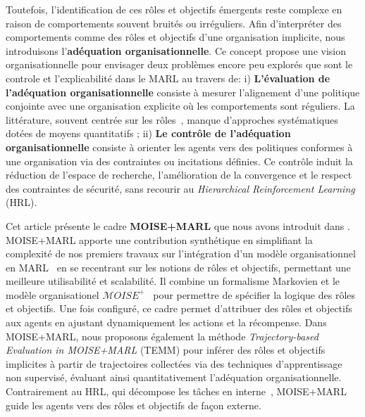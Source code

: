 \documentclass[final]{jfsma}
\begin{document}
Toutefois, l’identification de ces rôles et objectifs émergents reste complexe en raison de comportements souvent bruités ou irréguliers. Afin d’interpréter des comportements comme des rôles et objectifs d'une organisation implicite, nous introduisons l’\textbf{adéquation organisationnelle}.
Ce concept propose une vision organisationnelle pour envisager deux problèmes encore peu explorés que sont le controle et l'explicabilité dans le MARL au travers de:
i) \textbf{L'évaluation de l'adéquation organisationnelle} consiste à mesurer l'alignement d'une politique conjointe avec une organisation explicite où les comportements sont réguliers. La littérature, souvent centrée sur les rôles~\cite{Isakov2024, Wen2024, Xie2024}, manque d'approches systématiques dotées de moyens quantitatifs
; \quad
ii) \textbf{Le contrôle de l'adéquation organisationnelle} consiste à orienter les agents vers des politiques conformes à une organisation via des contraintes ou incitations définies. Ce contrôle induit la réduction de l'espace de recherche, l'amélioration de la convergence et le respect des contraintes de sécurité, sans recourir au \textit{Hierarchical Reinforcement Learning} (HRL).

\noindent Cet article présente le cadre \textbf{MOISE+MARL} que nous avons introduit dans \cite{soule2025moisemarl}. MOISE+MARL apporte une contribution synthétique en simplifiant la complexité de nos premiers travaux sur l'intégration d'un modèle organisationnel en MARL~\cite{soule2024paper-jfsma, soule2024aomea} en se recentrant sur les notions de rôles et objectifs, permettant une meilleure utilisabilité et scalabilité. Il combine un formalisme Markovien et le modèle organisationel $\mathcal{M}OISE^+$~\cite{Hubner2007} pour permettre de spécifier la logique des rôles et objectifs. Une fois configuré, ce cadre permet d'attribuer des rôles et objectifs aux agents en ajustant dynamiquement les actions et la récompense. Dans MOISE+MARL, nous proposons également la méthode \textit{Trajectory-based Evaluation in MOISE+MARL} (TEMM) pour inférer des rôles et objectifs implicites à partir de trajectoires collectées via des techniques d'apprentissage non supervisé, évaluant ainsi quantitativement l'adéquation organisationnelle. Contrairement au HRL, qui décompose les tâches en interne~\cite{Qi2024, Matsuyama2025, SaoMai2024}, MOISE+MARL guide les agents vers des rôles et objectifs de façon externe.
\end{document}
